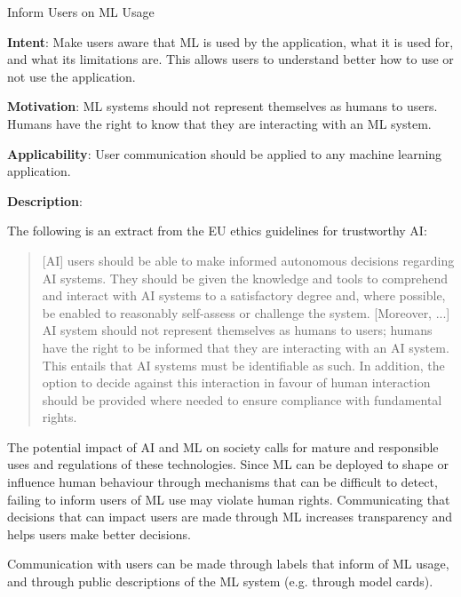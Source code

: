   
  \begin{frame}[plain]{ Inform Users on ML Usage
 }

  \textbf{Intent}: Make users aware that ML is used by the application, what it is used for, and what its limitations are. This allows users to understand better how to use or not use the application. 
 

  \textbf{Motivation}:  ML systems should not represent themselves as humans to users. Humans have the right to know that they are interacting with an ML system. 
 

  \textbf{Applicability}: User communication should be applied to any machine learning application. 
 

  \textbf{Description}: 

The following is an extract from the EU ethics guidelines for trustworthy AI:


\begin{quotation}
[AI] users should be able to make informed autonomous decisions regarding AI systems. They should be given the knowledge and tools to comprehend and interact with AI systems to a satisfactory degree and, where possible, be enabled to reasonably self-assess or challenge the system.
[Moreover, ...] AI system should not  represent  themselves  as  humans  to  users; humans have  the  right  to  be informed  that they  are  interacting  with  an  AI  system.  This  entails  that AI  systems must be identifiable  as  such.  In addition,  the  option  to  decide  against  this  interaction  in  favour  of  human  interaction  should  be  provided where needed  to  ensure  compliance  with  fundamental  rights.
\end{quotation}


The potential impact of AI and ML on society calls for mature and responsible uses and regulations of these technologies.
Since ML can be deployed to shape or influence human behaviour through mechanisms that can be difficult to detect, failing to inform users of ML use may violate human rights.
Communicating that decisions that can impact users are made through ML increases transparency and helps users make better decisions.


Communication with users can be made through labels that inform of ML usage, and through public descriptions of the ML system (e.g. through model cards).


 


  \end{frame}

